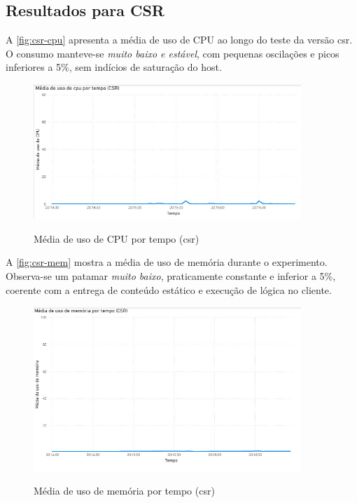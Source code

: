 \subsection{Resultados para CSR}
\label{subsec:resultados-csr}

A \autoref{fig:csr-cpu} apresenta a média de uso de CPU ao longo do teste da versão \acrshort{csr}. O consumo manteve-se \textit{muito baixo e estável}, com pequenas oscilações e picos inferiores a 5\%, sem indícios de saturação do host.

\begin{figure}[H]
  \centering
  \caption{Média de uso de CPU por tempo (\acrshort{csr})}
  \includegraphics[width=0.9\textwidth]{media/uso_cpu_csr.jpeg}
  \label{fig:csr-cpu}
\end{figure}

A \autoref{fig:csr-mem} mostra a média de uso de memória durante o experimento. Observa-se um patamar \textit{muito baixo}, praticamente constante e inferior a 5\%, coerente com a entrega de conteúdo estático e execução de lógica no cliente.

\begin{figure}[H]
  \centering
  \caption{Média de uso de memória por tempo (\acrshort{csr})}
  \includegraphics[width=0.9\textwidth]{media/uso_memoria_csr.jpeg}
  \label{fig:csr-mem}
\end{figure}

